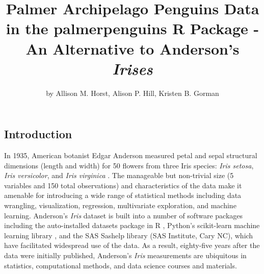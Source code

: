 \title{Palmer Archipelago Penguins Data in the palmerpenguins R Package - An
Alternative to Anderson's \emph{Irises}}
\author{by Allison M. Horst, Alison P. Hill, Kristen B. Gorman}

\maketitle


\hypertarget{introduction}{%
\subsection{Introduction}\label{introduction}}

In 1935, American botanist Edgar Anderson measured petal and sepal
structural dimensions (length and width) for 50 flowers from three Iris
species: \emph{Iris setosa}, \emph{Iris versicolor}, and \emph{Iris
virginica} \citep{anderson_irises_1935}. The manageable but non-trivial
size (5 variables and 150 total observations) and characteristics of the
data make it amenable for introducing a wide range of statistical
methods including data wrangling, visualization, regression,
multivariate exploration, and machine learning. Anderson's \emph{Iris}
dataset is built into a number of software packages including the
auto-installed datasets package in R \citep{r_core_team_r_2019},
Python's scikit-learn machine learning library
\citep{pedregosa_scikit-learn_2011}, and the SAS Sashelp library (SAS
Institute, Cary NC), which have facilitated widespread use of the data.
As a result, eighty-five years after the data were initially published,
Anderson's \emph{Iris} measurements are ubiquitous in statistics,
computational methods, and data science courses and materials.

